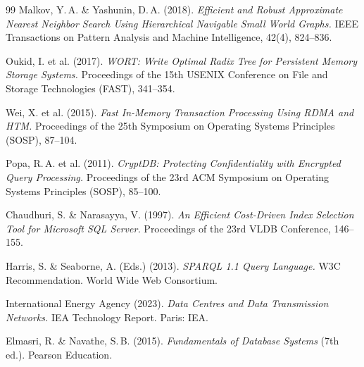 ﻿\documentclass[a4paper,12pt]{article}
\theoremstyle{definition}
\begin{document}
\begin{thebibliography}{99}
Malkov, Y.\,A. \& Yashunin, D.\,A. (2018).
\textit{Efficient and Robust Approximate Nearest Neighbor Search Using Hierarchical Navigable Small World Graphs.}
IEEE Transactions on Pattern Analysis and Machine Intelligence, 42(4), 824--836.

Oukid, I. et al. (2017).
\textit{WORT: Write Optimal Radix Tree for Persistent Memory Storage Systems.}
Proceedings of the 15th USENIX Conference on File and Storage Technologies (FAST), 341--354.

Wei, X. et al. (2015).
\textit{Fast In-Memory Transaction Processing Using RDMA and HTM.}
Proceedings of the 25th Symposium on Operating Systems Principles (SOSP), 87--104.

Popa, R.\,A. et al. (2011).
\textit{CryptDB: Protecting Confidentiality with Encrypted Query Processing.}
Proceedings of the 23rd ACM Symposium on Operating Systems Principles (SOSP), 85--100.

Chaudhuri, S. \& Narasayya, V. (1997).
\textit{An Efficient Cost-Driven Index Selection Tool for Microsoft SQL Server.}
Proceedings of the 23rd VLDB Conference, 146--155.

Harris, S. \& Seaborne, A. (Eds.) (2013).
\textit{SPARQL 1.1 Query Language.}
W3C Recommendation. World Wide Web Consortium.

International Energy Agency (2023).
\textit{Data Centres and Data Transmission Networks.}
IEA Technology Report. Paris: IEA.

Elmasri, R. \& Navathe, S.\,B. (2015).
\textit{Fundamentals of Database Systems} (7th ed.).
Pearson Education.

\end{thebibliography}
\end{document}
